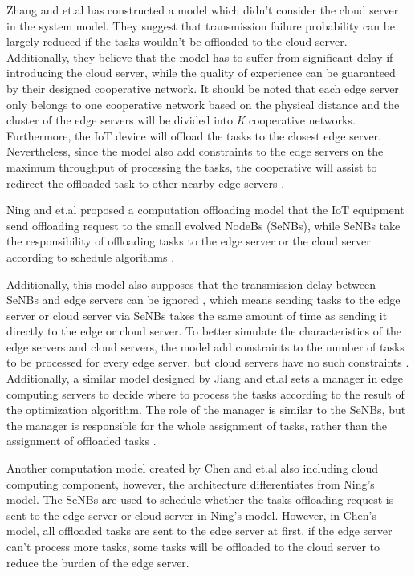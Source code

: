 \documentclass[a4paper,11pt]{article}
\begin{document}
Zhang and et.al has constructed a model which didn't consider the cloud server in the system model. They suggest that transmission failure probability can be largely reduced if the tasks wouldn't be offloaded to the cloud server. Additionally, they believe that the model has to suffer from significant delay if introducing the cloud server, while the quality of experience can be guaranteed by their designed cooperative network. It should be noted that each edge server only belongs to one cooperative network based on the physical distance and the cluster of the edge servers will be divided into \textit{K} cooperative networks. Furthermore, the IoT device will offload the tasks to the closest edge server. Nevertheless, since the model also add constraints to the edge servers on the maximum throughput of processing the tasks, the cooperative will assist to redirect the offloaded task to other nearby edge servers \cite{no_cloud_1_density}.\newline %

Ning and et.al proposed a computation offloading model that the IoT equipment send offloading request to the small evolved NodeBs (SeNBs), while SeNBs take the responsibility of offloading tasks to the edge server or the cloud server according to schedule algorithms \cite{A_Cooperative_Partial_Computation_Offloading_Scheme_for_Mobile_Edge}. 


Additionally, this model also supposes that the transmission delay between SeNBs and edge servers can be ignored \cite{A_Cooperative_Partial_Computation_Offloading_Scheme_for_Mobile_Edge}, which means sending tasks to the edge server or cloud server via SeNBs takes the same amount of time as sending it directly to the edge or cloud server. To better simulate the characteristics of the edge servers and cloud servers, the model add constraints to the number of tasks to be processed for every edge server, but cloud servers have no such constraints \cite{A_Cooperative_Partial_Computation_Offloading_Scheme_for_Mobile_Edge}. Additionally, a similar model designed by Jiang and et.al sets a manager in edge computing servers to decide where to process the tasks according to the result of the optimization algorithm. The role of the manager is similar to the SeNBs, but the manager is responsible for the whole assignment of tasks, rather than the assignment of offloaded tasks \cite{cloud_3_edgemanager}. \newline

Another computation model created by Chen and et.al also including cloud computing component, however, the architecture differentiates from Ning's model. The SeNBs are used to schedule whether the tasks offloading request is sent to the edge server or cloud server in Ning's model. However, in Chen's model, all offloaded tasks are sent to the edge server at first, if the edge server can't process more tasks, some tasks will be offloaded to the cloud server to reduce the burden of the edge server.\newline
\end{document}
